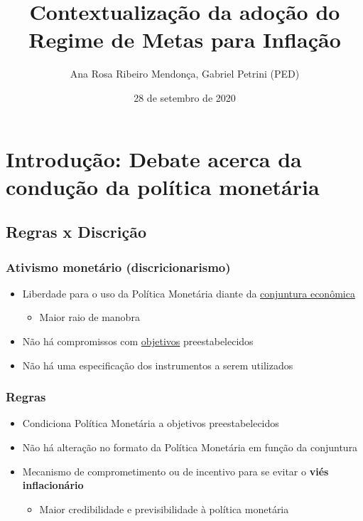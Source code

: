\documentclass[11pt]{article}
\author{Ana Rosa Ribeiro Mendonça, Gabriel Petrini (PED)}
\date{28 de setembro de 2020}
\title{Contextualização da adoção do Regime de Metas para Inflação}
\begin{document}
\maketitle

\section*{Introdução: Debate acerca da condução da política monetária}
\label{sec:org8e0d4c6}

\subsection*{Regras x Discrição}
\label{sec:org764b7b6}

\subsubsection*{Ativismo monetário (discricionarismo)}
\label{sec:orga3d17dc}

\begin{itemize}
\item Liberdade para o uso da Política Monetária diante da \uline{conjuntura econômica}
\begin{itemize}
\item Maior raio de manobra
\end{itemize}
\item Não há compromissos com \uline{objetivos} preestabelecidos
\item Não há uma especificação dos instrumentos a serem utilizados
\end{itemize}

\subsubsection*{Regras}
\label{sec:org5a212d1}

\begin{itemize}
\item Condiciona Política Monetária a objetivos preestabelecidos
\item Não há alteração no formato da Política Monetária em função da conjuntura
\item Mecanismo de comprometimento ou de incentivo para se evitar o \textbf{viés inflacionário}
\begin{itemize}
\item Maior credibilidade e previsibilidade à política monetária
\end{itemize}
\end{itemize}
\end{document}
